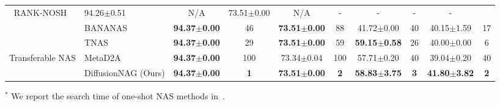 \begin{table*}[t!]
\begin{center}
{\begin{tabular}{clcccccccc}
                        RANK-NOSH~\citep{wang2021rank} &
                        94.26\tiny$\pm$0.51 &
                        N/A &
                        73.51\tiny$\pm$0.00 &
                        N/A &
                        - &
                        - &
                        - &
                        - \\
                        & 
                        BANANAS~\citep{white2019bananas} &
                        \textbf{94.37\tiny$\pm$0.00} &
                        46 &
                        \textbf{73.51\tiny$\pm$0.00} &
                        88 &
                        41.72\tiny$\pm$0.00 &
                        40 &
                        40.15\tiny$\pm$1.59 &
                        17 \\
                        
                        \midrule
                        &
                        TNAS~\citep{shala2023transfer} &
                        \textbf{94.37\tiny$\pm$0.00} &
                        29 &
                        \textbf{73.51\tiny$\pm$0.00} &
                        59 &
                        \textbf{59.15\tiny$\pm$0.58} &
                        26 &
                        40.00\tiny$\pm$0.00 &
                        6 \\
            
                        \multicolumn{1}{c}{\multirow{1}{*}{Transferable NAS}} &
                        MetaD2A~\citep{lee2021rapid} &
                        \textbf{94.37\tiny$\pm$0.00} &
                        100 &
                        73.34\tiny$\pm$0.04 &
                        100 &
                        57.71\tiny$\pm$0.20 &
                        40 &
                        39.04\tiny$\pm$0.20 &
                        40 \\
                         &
                        DiffusionNAG (Ours) &
                        \textbf{94.37\tiny$\pm$0.00} &
                        \textbf{1} &
                        \textbf{73.51\tiny$\pm$0.00} &
                        \textbf{2} &
                        \textbf{58.83\tiny$\pm$3.75} &
                        \textbf{3} &
                        \textbf{41.80\tiny$\pm$3.82} &
                        \textbf{2} \\
                       \bottomrule
                    \end{tabular}
                    }
                \end{center}
                \small
                \label{tbl:main_nasbench201}
                \vspace{-0.05in}
                    \scriptsize{$^*$ We report the search time of one-shot NAS methods in~.}
                \vspace{-0.05in}
            \end{table*}



